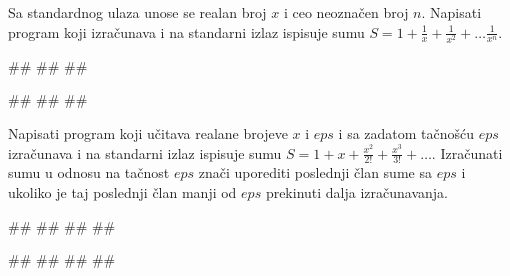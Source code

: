 \begin{Exercise}[label=p1.3_11]
 Sa standardnog ulaza unose se realan broj $x$ i ceo neoznačen broj
 $n$. Napisati program koji izračunava i na standarni izlaz ispisuje
 sumu $S=1+\frac{1}{x}+\frac{1}{x^2}+\ldots\frac{1}{x^n}$.
 
\begin{miditest}
\begin{upotreba}{1}
#\naslovInt#
##
##
\end{upotreba}
\end{miditest}
\begin{miditest}
\begin{upotreba}{2}
#\naslovInt#
##
##
\end{upotreba}
\end{miditest}
\end{Exercise}
\begin{Answer}[ref=p1.3_11]
\end{Answer}


\begin{Exercise}[difficulty=1, label=p1.3_12] 
Napisati program koji učitava realane brojeve $x$ i $eps$ i sa zadatom
tačnošću $eps$ izračunava i na standarni izlaz ispisuje sumu
$S=1+x+\frac{x^2}{2!}+\frac{x^3}{3!}+\ldots$.   Izračunati sumu u odnosu
  na tačnost $eps$ znači uporediti poslednji član sume sa $eps$ i
  ukoliko je taj poslednji član manji od $eps$ prekinuti dalja
  izračunavanja.
  
\begin{miditest}
\begin{upotreba}{1}
#\naslovInt#
##
##
##
\end{upotreba}
\end{miditest}
\begin{miditest}
\begin{upotreba}{2}
#\naslovInt#
##
##
##
\end{upotreba}
\end{miditest}
\end{Exercise}
\begin{Answer}[ref=p1.3_12]
\end{Answer}


